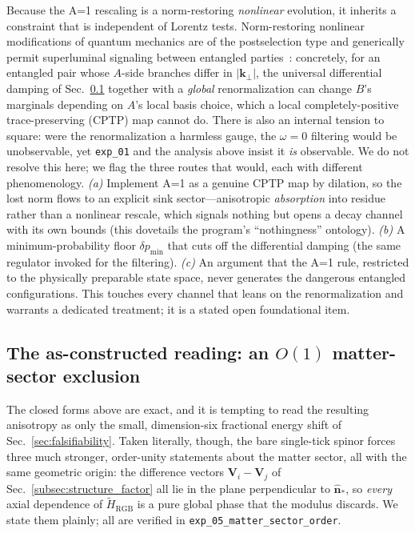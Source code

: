 \begin{remark}
\label{rem:nonlinear_qm}
Because the A=1 rescaling is a norm-restoring \emph{nonlinear} evolution, it inherits a
constraint that is independent of Lorentz tests. Norm-restoring nonlinear modifications of
quantum mechanics are of the postselection type and generically permit superluminal
signaling between entangled parties~\cite{weinberg1989,gisin1990,polchinski1991}:
concretely, for an entangled pair whose $A$-side branches differ in $|\mathbf{k}_\perp|$,
the universal differential damping of Sec.~\ref{subsec:as_constructed} together with a
\emph{global} renormalization can change $B$'s marginals depending on $A$'s local basis
choice, which a local completely-positive trace-preserving (CPTP) map cannot do. There is
also an internal tension to square: were the renormalization a harmless gauge, the
$\omega=0$ filtering would be unobservable, yet \texttt{exp\_01} and the analysis above
insist it \emph{is} observable. We do not resolve this here; we flag the three routes that
would, each with different phenomenology. \emph{(a)} Implement A=1 as a genuine CPTP map by
dilation, so the lost norm flows to an explicit sink sector---anisotropic \emph{absorption}
into residue rather than a nonlinear rescale, which signals nothing but opens a decay
channel with its own bounds (this dovetails the program's ``nothingness'' ontology).
\emph{(b)} A minimum-probability floor $\delta p_\text{min}$ that cuts off the differential
damping (the same regulator invoked for the filtering). \emph{(c)} An argument that the
A=1 rule, restricted to the physically preparable state space, never generates the
dangerous entangled configurations. This touches every channel that leans on the
renormalization and warrants a dedicated treatment; it is a stated open foundational item.
\end{remark}

\subsection{The as-constructed reading: an $O(1)$ matter-sector exclusion}
\label{subsec:as_constructed}

The closed forms above are exact, and it is tempting to read the resulting
anisotropy as only the small, dimension-six fractional energy shift of
Sec.~\ref{sec:falsifiability}. Taken literally, though, the bare single-tick
spinor forces three much stronger, order-unity statements about the matter sector,
all with the same geometric origin: the difference vectors
$\mathbf{V}_i-\mathbf{V}_j$ of Sec.~\ref{subsec:structure_factor} all lie in the
plane perpendicular to $\hat{\mathbf{n}}_*$, so \emph{every} axial dependence of
$\tilde H_\text{RGB}$ is a pure global phase that the modulus discards. We state
them plainly; all are verified in \texttt{exp\_05\_matter\_sector\_order}.


